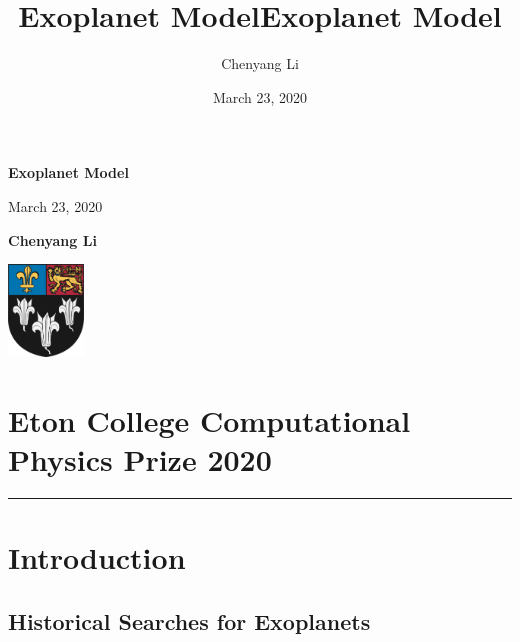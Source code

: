 \documentclass[11pt]{article}
\title{Exoplanet Model}
\title{Exoplanet Model}
\author{Chenyang Li}
\date{March 23, 2020}
\begin{document}
	
	\begin{titlepage}
		\begin{center}
			\vspace*{1cm}
			
			\Huge
			\textbf{Exoplanet Model}
			
			\vspace{0.5cm}
			\LARGE
			March 23, 2020
			
			\vspace{1.5cm}
			
			\textbf{Chenyang Li}
			
			\vfill
			
			
			\includegraphics[width=0.15\textwidth]{crest}
			
			\vspace{0.8cm}
			
			\hypertarget{eton-college-computational-physics-prize-2020}{%
			\section*{Eton College Computational Physics Prize 2020}\label{eton-college-computational-physics-prize-2020}}
			
			
		\end{center}
	\end{titlepage}
	


	\pagebreak
	\begingroup %
	\color{black}%
	\tableofcontents
	\endgroup
	\pagebreak


    \maketitle
    \begin{center}\rule{0.5\linewidth}{0.5pt}\end{center}
    
    \hypertarget{introduction}{%
\section{Introduction}\label{introduction}}


\hypertarget{historical-searches-for-exoplanets}{%
\subsection{Historical Searches for Exoplanets}\label{historical-searches-for-exoplanets}}
\end{document}
